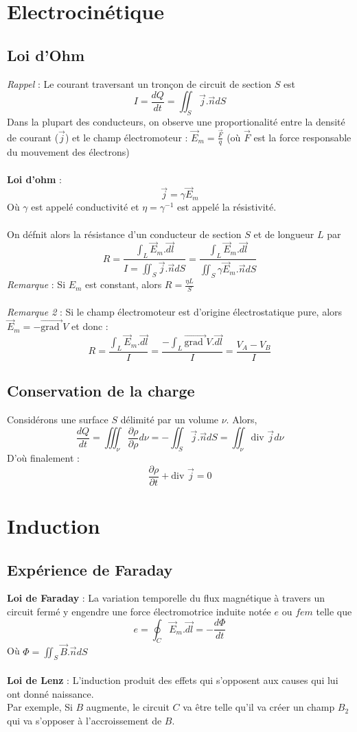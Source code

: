 \section{Electrocinétique}
\subsection{Loi d'Ohm}

\emph{Rappel} :  Le courant traversant un tronçon de circuit de section $S$ est \[ I=\frac{dQ}{dt}=\iint_S\vec{j}.\vec{n}dS \]
Dans la plupart des conducteurs, on observe une proportionalité entre la densité de courant ($\vec{j}$) et le champ électromoteur : $\vec{E}_m=\frac{\vec{F}}{q}$ (où $\vec{F}$ est la force responsable du mouvement des électrons)\\\\
\noindent\textbf{Loi d'ohm} : \[ \vec{j}=\gamma\vec{E}_m \]
Où $\gamma$ est appelé conductivité et $\eta=\gamma^{-1}$ est appelé la résistivité.\\\\
\noindent On défnit alors la résistance d'un conducteur de section $S$ et de longueur $L$ par
\[ R=\frac{\int_L\vec{E}_m.\vec{dl}}{I=\iint_S\vec{j}.\vec{n}dS}=\frac{\int_L\vec{E}_m.\vec{dl}}{\iint_S\gamma\vec{E}_m.\vec{n}dS} \]
\emph{Remarque} : Si $E_m$ est constant, alors $R=\frac{\eta L}{S}$\\\\
\noindent\emph{Remarque 2} : Si  le champ électromoteur est d'origine électrostatique pure, alors $\vec{E}_m=-\vec{\textrm{grad }}V$ et donc : 
\[ R=\frac{\int_L\vec{E}_m.\vec{dl}}{I}=\frac{-\int_L\vec{\textrm{grad }}V.\vec{dl}}{I}=\frac{V_A-V_B}{I} \]

\subsection{Conservation de la charge}
Considérons une surface $S$ délimité par un volume $\nu$. Alors,
\[ \frac{dQ}{dt}=\iiint_\nu\frac{\partial \rho}{\partial \rho}d\nu=-\iint_S\vec{j}.\vec{n}dS=\iint_\nu\textrm{div }\vec{j}d\nu \]
D'où finalement : 
\[ \frac{\partial\rho}{\partial t}+\textrm{div }\vec{j}=0 \]

\section{Induction}
\subsection{Expérience de Faraday}
\noindent\textbf{Loi de Faraday} : La variation temporelle du flux magnétique à travers un circuit fermé y engendre une force électromotrice induite notée $e$ ou $fem$ telle que
\[ e=\oint_C\vec{E}_m.\vec{dl}=-\frac{d\Phi}{dt} \]
Où $\Phi=\iint_S\vec{B}.\vec{n}dS$\\\\
\noindent\textbf{Loi de Lenz} : L'induction produit des effets qui s'opposent aux causes qui lui ont donné naissance.\\
Par exemple, Si $B$ augmente, le circuit $C$  va être telle qu'il va créer un champ $B_2$ qui va s'opposer à l'accroissement de $B$.

